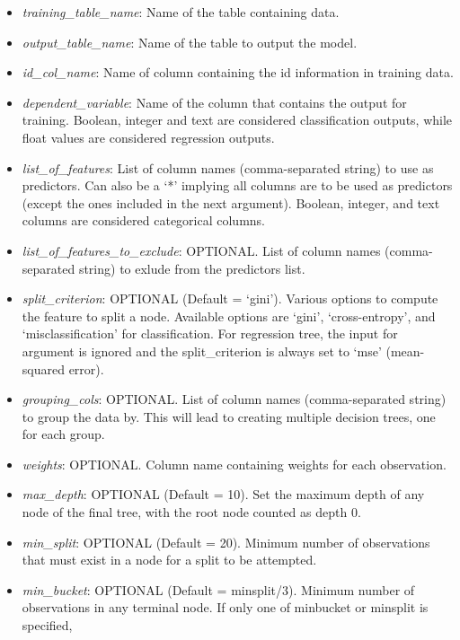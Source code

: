 \begin{itemize}
    \item \emph{training\_table\_name}: Name of the table containing data.
    \item \emph{output\_table\_name}: Name of the table to output the model.
    \item \emph{id\_col\_name}: Name of column containing the id information in training data.
    \item \emph{dependent\_variable}: Name of the column that contains the
    output for training. Boolean, integer and text are considered classification
    outputs, while float values are considered regression outputs.
    \item \emph{list\_of\_features}: List of column names (comma-separated string)
    to use as predictors. Can also be a `*' implying all columns are to be used
    as predictors (except the ones included in the next argument). Boolean, integer, and
    text columns are considered categorical columns.
    \item \emph{list\_of\_features\_to\_exclude}: OPTIONAL. List of column names
    (comma-separated string) to exlude from the predictors list.
    \item \emph{split\_criterion}: OPTIONAL (Default = `gini'). Various options
    to compute the feature to split a node. Available options are `gini',
    `cross-entropy', and `misclassification' for classification.
    For regression tree, the input for argument is ignored and the
    split\_criterion is always set to `mse' (mean-squared error).
    \item \emph{grouping\_cols}: OPTIONAL. List of column names (comma-separated string) to group
    the data by. This will lead to creating multiple decision trees, one for each group.
    \item \emph{weights}: OPTIONAL. Column name containing weights for each observation.
    \item \emph{max\_depth}: OPTIONAL (Default = 10). Set the maximum depth of
    any node of the final tree, with the root node counted as depth 0.
    \item \emph{min\_split}: OPTIONAL (Default = 20). Minimum number of observations that
    must exist in a node for a split to be attempted.
    \item \emph{min\_bucket}: OPTIONAL (Default = minsplit/3). Minimum number of observations
    in any terminal node. If only one of minbucket or minsplit is specified,

\end{itemize}
